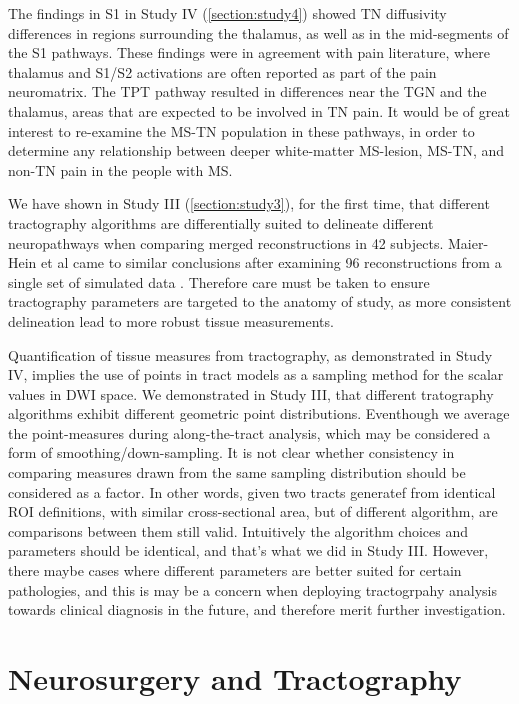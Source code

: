 The findings in S1 in Study IV (\ref{section:study4}) showed TN diffusivity differences in regions surrounding the thalamus, as well as in the mid-segments of the S1 pathways. These findings were in agreement with pain literature, where thalamus and S1/S2 activations are often reported as part of the pain neuromatrix. The TPT pathway resulted in differences near the TGN and the thalamus, areas that are expected to be involved in TN pain. It would be of great interest to re-examine the MS-TN population in these pathways, in order to determine any relationship between deeper white-matter MS-lesion, MS-TN, and non-TN pain in the people with MS.

We have shown in Study III (\ref{section:study3}), for the first time, that different tractography algorithms are differentially suited to delineate different neuropathways when comparing merged reconstructions in 42 subjects. Maier-Hein et al came to similar conclusions after examining 96 reconstructions from a single set of simulated data \cite{Maier-Hein2017}.
Therefore care must be taken to ensure tractography parameters are targeted to the anatomy of study, as more consistent delineation lead to more robust tissue measurements.

Quantification of tissue measures from tractography, as demonstrated in Study IV, implies the use of points in tract models as a sampling method for the scalar values in DWI space. We demonstrated in Study III, that different tratography algorithms exhibit different geometric point distributions. Eventhough we average the point-measures during along-the-tract analysis, which may be considered a form of smoothing/down-sampling. It is not clear whether consistency in comparing measures drawn from the same sampling distribution should be considered as a factor. In other words, given two tracts generatef from identical ROI definitions, with similar cross-sectional area, but of different algorithm, are comparisons between them still valid. Intuitively the algorithm choices and parameters should be identical, and that's what we did in Study III. However, there maybe cases where different parameters are better suited for certain pathologies, and this is may be a concern when deploying tractogrpahy analysis towards clinical diagnosis in the future, and therefore merit further investigation.


\section{Neurosurgery and Tractography}

